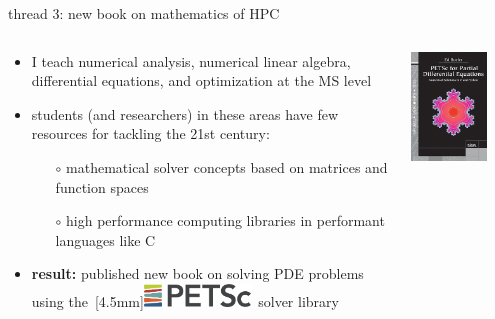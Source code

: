 \documentclass[svgnames,
               hyperref={colorlinks,citecolor=DeepPink4,linkcolor=FireBrick,urlcolor=Maroon},
               usepdftitle=false]  %
               {beamer}
\begin{document}
\begin{frame}{thread 3: new book on mathematics of HPC}

\begin{columns}
\begin{column}{0.6\textwidth}
\begin{itemize}
\item I teach numerical analysis, numerical linear algebra, differential equations, and optimization at the MS level
\item students (and researchers) in these areas have few resources for tackling the 21st century:
    \begin{itemize}
    \item[$\circ$] {\color{FireBrick} mathematical solver concepts} based on matrices and function spaces
    \item[$\circ$] {\color{FireBrick} high performance computing libraries} in performant languages like C
    \end{itemize}
\item \textbf{result:} published {\color{FireBrick} new book} on solving PDE problems using the \,\raisebox{-3pt}[4.5mm]{\href{https://petsc.org/release/}{\includegraphics[width=0.3\textwidth]{figs/petsc.png}}}\, solver library
\end{itemize}
\end{column}
\begin{column}{0.4\textwidth}
\vspace{2mm}

\hfill \href{https://epubs.siam.org/doi/book/10.1137/1.9781611976311}{\includegraphics[width=0.75\textwidth]{figs/frontcover.jpg}}


\end{column}
\end{columns}
\end{frame}
\end{document}
